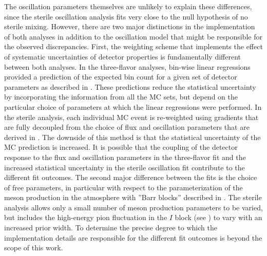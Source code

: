 The oscillation parameters themselves are unlikely to explain these differences, since the sterile oscillation analysis fits very close to the null hypothesis of no sterile mixing. However, there are two major distinctions in the implementation of both analyses in addition to the oscillation model that might be responsible for the observed discrepancies. First, the weighting scheme that implements the effect of systematic uncertainties of detector properties is fundamentally different between both analyses. In the three-flavor analyses, bin-wise linear regressions provided a prediction of the expected bin count for a given set of detector parameters as described in . These predictions reduce the statistical uncertainty by incorporating the information from all the MC sets, but depend on the particular choice of parameters at which the linear regressions were performed. In the sterile analysis, each individual MC event is re-weighted using gradients that are fully decoupled from the choice of flux and oscillation parameters that are derived in . The downside of this method is that the statistical uncertainty of the MC prediction is increased. It is possible that the coupling of the detector response to the flux and oscillation parameters in the three-flavor fit and the increased statistical uncertainty in the sterile oscillation fit contribute to the different fit outcomes. The second major difference between the fits is the choice of free parameters, in particular with respect to the parameterization of the meson production in the atmosphere with ''Barr blocks'' described in . The sterile analysis allows only a small number of meson production parameters to be varied, but includes the high-energy pion fluctuation in the $I$ block (see ) to vary with an increased prior width.  To determine the precise degree to which the implementation details are responsible for the different fit outcomes is beyond the scope of this work.

